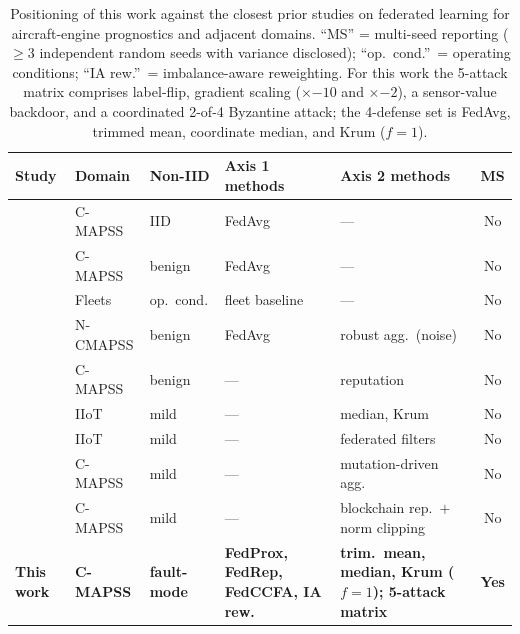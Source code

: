 \documentclass[a4paper,fleqn,doubleblind]{cas-sc}
\newcommand{\tblhead}{\rowcolor{tblHeadBg}}
\newcommand{\zebra}{\rowcolors{2}{tblAltBg}{white}}
\newcommand{\tblhead}{}
\newcommand{\zebra}{}
\begin{document}
\begin{table}[pos=tbp]
\centering
\footnotesize
\setlength{\tabcolsep}{4pt}
\renewcommand{\arraystretch}{1.2}
\caption{Positioning of this work against the closest prior
studies on federated learning for aircraft-engine prognostics
and adjacent domains. ``MS'' = multi-seed reporting
($\geq 3$ independent random seeds with variance disclosed);
``op.\ cond.''\ = operating conditions;
``IA rew.''\ = imbalance-aware reweighting.
For this work the 5-attack matrix comprises label-flip,
gradient scaling ($\times{-10}$ and $\times{-2}$), a
sensor-value backdoor, and a coordinated 2-of-4 Byzantine
attack; the 4-defense set is FedAvg, trimmed mean, coordinate
median, and Krum ($f = 1$).}
\label{tab:positioning}
\zebra
\begin{tabular}{@{}>{\raggedright\arraybackslash}p{3.6cm} l l >{\raggedright\arraybackslash}p{2.5cm} >{\raggedright\arraybackslash}p{2.8cm} c@{}}
\toprule
\tblhead
Study & Domain & Non-IID & Axis 1 methods & Axis 2 methods & MS \\
\midrule
\citet{Barbosa2025FLJetEngines}       & C-MAPSS  & IID          & FedAvg              & ---                                     & No \\
\citet{Vermelin2024CollabFLRUL}       & C-MAPSS  & benign       & FedAvg              & ---                                     & No \\
\citet{Pandhare2021FederatedBaseline} & Fleets   & op.\ cond.   & fleet baseline      & ---                                     & No \\
\citet{Landau2025CollabRUL}           & N-CMAPSS & benign       & FedAvg              & robust agg.\ (noise)                    & No \\
\citet{Rehman2021TrustFed}            & C-MAPSS  & benign       & ---                 & reputation                              & No \\
\citet{Li2023ByzantineFLIIoT}         & IIoT     & mild         & ---                 & median, Krum                            & No \\
\citet{Hou2022FederatedFiltersIIoT}   & IIoT     & mild         & ---                 & federated filters                       & No \\
\citet{Tallat2026BioMutFedPlus}       & C-MAPSS  & mild         & ---                 & mutation-driven agg.                    & No \\
\citet{Li2026TrustworthyFLIIoT}       & C-MAPSS  & mild         & ---                 & blockchain rep.\ $+$ norm clipping      & No \\
\midrule
\textbf{This work} & \textbf{C-MAPSS} & \textbf{fault-mode} & \textbf{FedProx, FedRep, FedCCFA, IA rew.} & \textbf{trim.\ mean, median, Krum ($f{=}1$); 5-attack matrix} & \textbf{Yes} \\
\bottomrule
\end{tabular}
\end{table}
\end{document}
